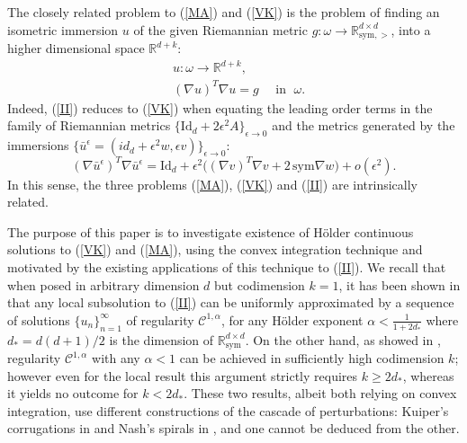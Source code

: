 \documentclass[reqno,twoside,11pt]{amsart}
\newcommand{\sym}{\mathrm{sym}}
\newcommand{\Id}{\mathrm{Id}}
\newcommand{\R}{\mathbb{R}}
\numberwithin{equation}{section}
\theoremstyle{plain}
\theoremstyle{definition}
\begin{document}
\bigskip

\noindent The closely related problem to (\ref{MA}) and (\ref{VK}) is the problem
of finding an isometric immersion $u$ of the given Riemannian metric
$g:\omega\to\R^{d\times d}_{\sym, >}$, into a higher dimensional space $\R^{d+k}$:
\begin{equation*}\tag{II}\label{II}
\begin{split}
& u:\omega\to \R^{d+k},
\\ & (\nabla u)^T\nabla u = g\quad\mbox{ in }\;\omega.
\end{split}
\end{equation*}
Indeed, (\ref{II}) reduces to (\ref{VK}) when equating the leading order terms in
the family of Riemannian metrics $\{\Id_d+2\epsilon^2 A\}_{\epsilon\to 0}$
and the metrics generated by the immersions $\{\bar u^\epsilon =
({id}_d+\epsilon^2w, \epsilon v)\}_{\epsilon\to 0}$:
$$(\nabla \bar u^\epsilon)^T\nabla \bar u^\epsilon = \mbox{Id}_d +
\epsilon^2 \big((\nabla v)^T\nabla v + 2\, \sym\nabla w\big) + o(\epsilon^2).$$
In this sense, the three problems (\ref{MA}), (\ref{VK}) and
(\ref{II}) are intrinsically related. 

\bigskip

\noindent The purpose of this paper is to
investigate existence of H\"older continuous solutions to (\ref{VK})
and (\ref{MA}), using the convex integration technique and motivated
by the existing applications of this technique to (\ref{II}).
We recall that when posed in arbitrary dimension $d$ but codimension $k=1$,
it has been shown in \cite[Theorem 1.1]{CDS} that any local
subsolution to (\ref{II}) can be uniformly approximated
by a sequence of solutions $\{u_n\}_{n=1}^\infty$ of regularity
$\mathcal{C}^{1,\alpha}$, for any H\"older exponent
$\alpha<\frac{1}{1+2d_*}$ where  $d_*=d(d+1)/2$ is the
dimension of $\R^{d\times d}_\sym$. On the other hand, as showed in
\cite{Kallen}, regularity $\mathcal{C}^{1,\alpha}$ with any $\alpha <1$ can be achieved in
sufficiently high codimension $k$; however even for the local result
this argument strictly requires $k\geq 2d_*$, whereas it yields no outcome for
$k<2d_*$.  These two results, albeit both relying  
on convex integration, use different
constructions of the cascade of perturbations: Kuiper's corrugations
in \cite{CDS} and Nash's spirals in \cite{Kallen}, and one cannot be
deduced from the other. 

\medskip
\end{document}
